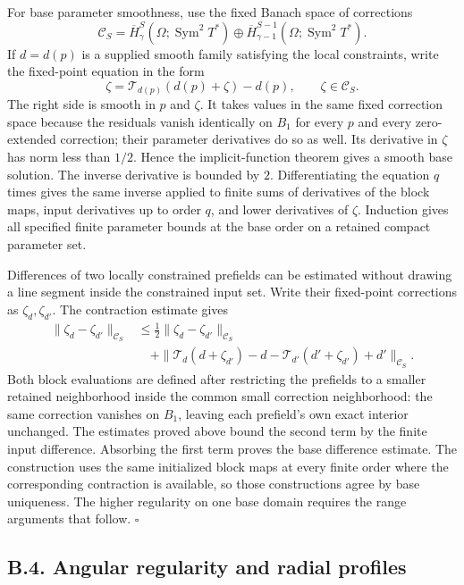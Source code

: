 \documentclass[
  english,
  11pt,
  reqno]{amsart}
\begin{document}
For base parameter smoothness, use the fixed Banach space of corrections
\[
\mathcal C_S=
\overline H^S_\gamma(\Omega;\operatorname{Sym}^2T^*)
\oplus
\overline H^{S-1}_{\gamma-1}(\Omega;\operatorname{Sym}^2T^*).
\] If \(d=d(p)\) is a supplied smooth family satisfying the local
constraints, write the fixed-point equation in the form \[
\zeta=\mathcal T_{d(p)}(d(p)+\zeta)-d(p),
\qquad \zeta\in\mathcal C_S.
\] The right side is smooth in \(p\) and \(\zeta\). It takes values in
the same fixed correction space because the residuals vanish identically
on \(B_1\) for every \(p\) and every zero-extended correction; their
parameter derivatives do so as well. Its derivative in \(\zeta\) has
norm less than \(1/2\). Hence the implicit-function theorem gives a
smooth base solution. The inverse derivative is bounded by \(2\).
Differentiating the equation \(q\) times gives the same inverse applied
to finite sums of derivatives of the block maps, input derivatives up to
order \(q\), and lower derivatives of \(\zeta\). Induction gives all
specified finite parameter bounds at the base order on a retained
compact parameter set.

Differences of two locally constrained prefields can be estimated
without drawing a line segment inside the constrained input set. Write
their fixed-point corrections as \(\zeta_d,\zeta_{d'}\). The contraction
estimate gives \[
\begin{aligned}
\|\zeta_d-\zeta_{d'}\|_{\mathcal C_S}
&\le\frac12\|\zeta_d-\zeta_{d'}\|_{\mathcal C_S}\\
&\quad+
\|\mathcal T_d(d+\zeta_{d'})-d
-\mathcal T_{d'}(d'+\zeta_{d'})+d'\|_{\mathcal C_S}.
\end{aligned}
\] Both block evaluations are defined after restricting the prefields to
a smaller retained neighborhood inside the common small correction
neighborhood: the same correction vanishes on \(B_1\), leaving each
prefield's own exact interior unchanged. The estimates proved above
bound the second term by the finite input difference. Absorbing the
first term proves the base difference estimate. The construction uses
the same initialized block maps at every finite order where the
corresponding contraction is available, so those constructions agree by
base uniqueness. The higher regularity on one base domain requires the
range arguments that follow. \hfill\(\square\)

\subsection{B.4. Angular regularity and radial
profiles}\label{b.4.-angular-regularity-and-radial-profiles}\label{sec:online-extension-angular-regularity}
\end{document}
